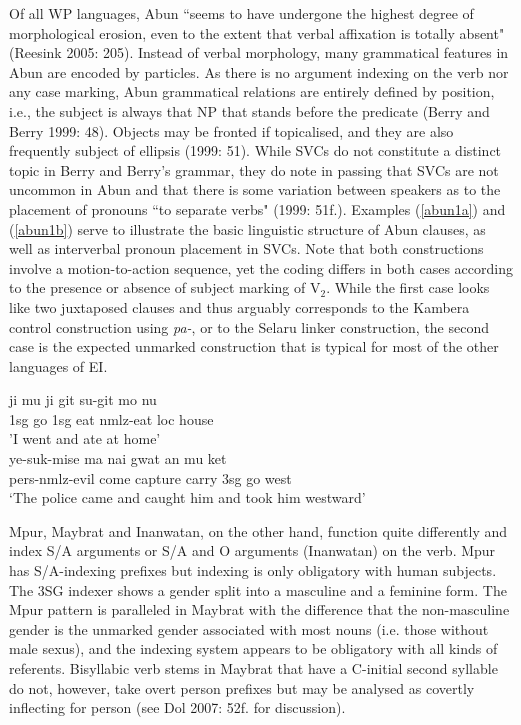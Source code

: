 Of all WP languages, Abun ``seems to have undergone the highest degree of morphological erosion, even to the extent that verbal affixation is totally absent" (Reesink 2005: 205). Instead of verbal morphology, many grammatical features in Abun are encoded by particles. As there is no argument indexing on the verb nor any case marking, Abun grammatical relations are entirely defined by position, i.e., the subject is always that NP that stands before the predicate (Berry and Berry 1999: 48). Objects may be fronted if topicalised, and they are also frequently subject of ellipsis (1999: 51). While SVCs do not constitute a distinct topic in Berry and Berry's grammar, they do note in passing that SVCs are not uncommon in Abun and that there is some variation between speakers as to the placement of pronouns ``to separate verbs" (1999: 51f.). Examples (\ref{abun1a}) and (\ref{abun1b}) serve to illustrate the basic linguistic structure of Abun clauses, as well as interverbal pronoun placement in SVCs. Note that both constructions involve a motion-to-action sequence, yet the coding differs in both cases according to the presence or absence of subject marking of V$_2$. While the first case looks like two juxtaposed clauses and thus arguably corresponds to the Kambera control construction using \textit{pa-}, or to the Selaru linker construction, the second case is the expected unmarked construction that is typical for most of the other languages of EI.

\pex 
\a \label{abun1a}
\gll ji mu ji git su-git mo nu \\
\acs{1}\acs{sg} go \acs{1}\acs{sg} eat \acs{nmlz}-eat \acs{loc} house \\
\glft 'I went and ate at home' \\ 
\z
\a \label{abun1b}
\gla ye-suk-mise ma nai gwat an mu ket \\ 
\acs{pers}-\acs{nmlz}-evil come capture carry \acs{3}\acs{sg} go west \\
\glft `The police came and caught him and took him westward' \\ 
\z
\xe

Mpur, Maybrat and Inanwatan, on the other hand, function quite differently and index S/A arguments or S/A and O arguments (Inanwatan) on the verb. Mpur has S/A-indexing prefixes but indexing is only obligatory with human subjects. The 3SG indexer shows a gender split into a masculine and a feminine form. The Mpur pattern is paralleled in Maybrat with the difference that the non-masculine gender is the unmarked gender associated with most nouns (i.e. those without male sexus), and the indexing system appears to be obligatory with all kinds of referents. Bisyllabic verb stems in Maybrat that have a C-initial second syllable do not, however, take overt person prefixes but may be analysed as covertly inflecting for person (see Dol 2007: 52f. for discussion).

